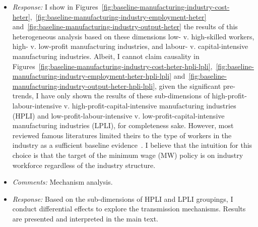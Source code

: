 \documentclass[12pt, english]{article}
\begin{document}
\begin{itemize}
        \item \textit{Response:} I show in Figures~\ref{fig:baseline-manufacturing-industry-cost-heter},~\ref{fig:baseline-manufacturing-industry-employment-heter} and~\ref{fig:baseline-manufacturing-industry-output-heter} the results of this heterogeneous analysis based on these dimensions low- v. high-skilled workers, high- v. low-profit manufacturing industries, and labour- v. capital-intensive manufacturing industries. Albeit, I cannot claim causality in Figures~\ref{fig:baseline-manufacturing-industry-cost-heter-hpli-lpli},~\ref{fig:baseline-manufacturing-industry-employment-heter-hpli-lpli} and~\ref{fig:baseline-manufacturing-industry-output-heter-hpli-lpli}, given the significant pre-trends, I have only shown the results of these sub-dimensions of high-profit-labour-intensive v. high-profit-capital-intensive manufacturing industries (HPLI) and low-profit-labour-intensive v. low-profit-capital-intensive manufacturing industries (LPLI), for completeness sake. However, most reviewed famous literatures limited theirs to the type of workers in the industry as a sufficient baseline evidence~\parencite{cengiz2019effect, gopalan2021state, clemens2019making, dube2010minimum, dustmann2022reallocation}. I believe that the intuition for this choice is that the target of the minimum wage (MW) policy is on industry workforce regardless of the industry structure.
        
        \item \textit{Comments:} Mechanism analysis.
        \item \textit{Response:} Based on the sub-dimensions of HPLI and LPLI groupings, I conduct differential effects to explore the transmission mechanisms. Results are presented and interpreted in the main text.
    \end{itemize}
    \newpage
    \printbibliography
\end{document}
